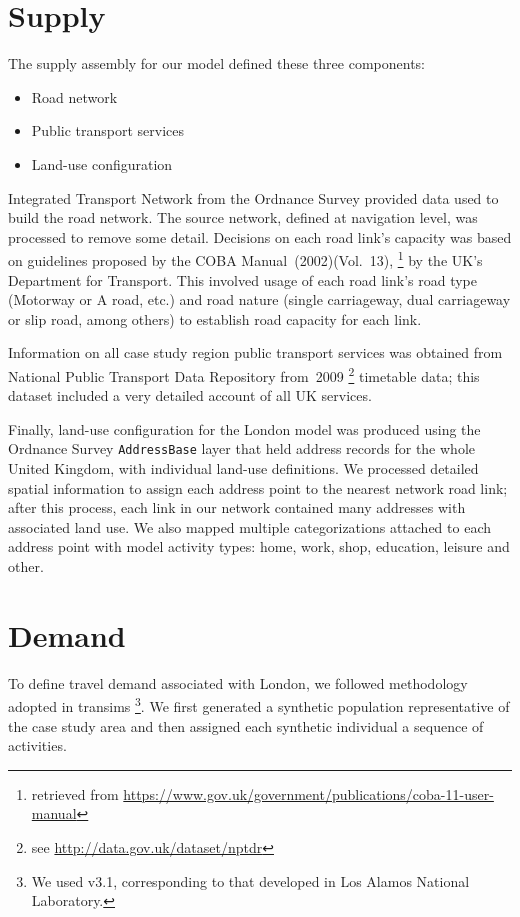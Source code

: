 \section{Supply}
The supply assembly for our model defined these three components:
%
\begin{itemize}\styleItemize
\item	Road network
\item	Public transport services
\item	Land-use configuration
\end{itemize}
%
Integrated Transport Network from the Ordnance Survey provided data used to build the road network. 
The source network, defined at navigation level, was processed to remove some detail. 
Decisions on each road link's capacity was based on guidelines proposed by the COBA Manual~(2002)(Vol.~13),%
\footnote{retrieved from \url{https://www.gov.uk/government/publications/coba-11-user-manual}} 
by the UK’s Department for Transport. 
This involved usage of each road link’s road type (Motorway or A road, etc.) and road nature (single carriageway, dual carriageway or slip road, among others) to establish road capacity for each link.

Information on all case study region public transport services was obtained from National Public Transport Data Repository from~2009%
\footnote{see \url{http://data.gov.uk/dataset/nptdr}} timetable data; this dataset included a very detailed account of all UK services.

Finally, land-use configuration for the London model was produced using the Ordnance Survey \lstinline|AddressBase| layer that held address records for the whole United Kingdom, with individual land-use definitions. 
We processed detailed spatial information to assign each address point to the nearest network road link; after this process, each link in our network contained many addresses with associated land use. 
We also mapped multiple categorizations attached to each address point with model activity types: home, work, shop, education, leisure and other.

\section{Demand}
To define travel demand associated with London, we followed methodology adopted in \gls{transims}%
\footnote {We used v3.1, corresponding to that developed in Los Alamos National Laboratory.}. We first generated a synthetic population representative of the case study area and then assigned each synthetic individual a sequence of activities.

